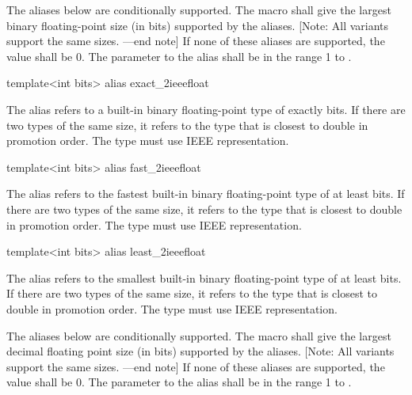 \begin{addedblock}
The aliases below are conditionally supported. The macro  shall give the largest binary floating-point size (in bits) supported by the aliases. [Note: All variants support the same sizes. —end note] If none of these aliases are supported, the value shall be 0. The parameter to the alias shall be in the range 1 to .

\begin{itemdecl}
template<int bits> alias exact_2ieeefloat
\end{itemdecl}

\begin{itemdescr}
The alias  refers to a built-in binary floating-point type of exactly  bits. If there are two types of the same size, it refers to the type that is closest to double in promotion order. The type must use IEEE representation.
\end{itemdescr}

\begin{itemdecl}
template<int bits> alias fast_2ieeefloat
\end{itemdecl}

\begin{itemdescr}
The alias  refers to the fastest built-in binary floating-point type of at least  bits. If there are two types of the same size, it refers to the type that is closest to double in promotion order. The type must use IEEE representation.
\end{itemdescr}

\begin{itemdecl}
template<int bits> alias least_2ieeefloat
\end{itemdecl}

\begin{itemdescr}
The alias  refers to the smallest built-in binary floating-point type of at least  bits. If there are two types of the same size, it refers to the type that is closest to double in promotion order. The type must use IEEE representation.
\end{itemdescr}

The aliases below are conditionally supported. The macro  shall give the largest decimal floating point size (in bits) supported by the aliases. [Note: All variants support the same sizes. —end note] If none of these aliases are supported, the value shall be 0. The parameter to the alias shall be in the range 1 to .


\end{addedblock}
